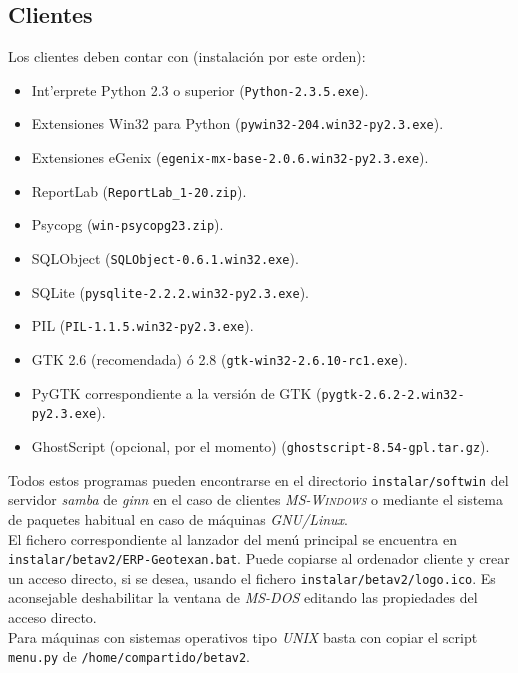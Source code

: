 \documentclass[a4paper]{article}
\newcommand{\marginalnote}[1]{\mbox{}\marginpar{\raggedright\hspace{0pt}#1}}
\newcommand{\iconomargen}[2]{%
  \marginalnote{%
    \parbox[t][\baselineskip * (#1-1)][b]{\marginparwidth}{%
      \texttt{[image: \#2]}%
    }
  }
}
\begin{document}
        \subsection{Clientes}
            Los clientes deben contar con (instalación por este orden):
            \begin{itemize}
            \item Int'erprete Python 2.3 o superior (\texttt{Python-2.3.5.exe}).
            \item Extensiones Win32 para Python (\texttt{pywin32-204.win32-py2.3.exe}).
            \item Extensiones eGenix (\texttt{egenix-mx-base-2.0.6.win32-py2.3.exe}).
            \item ReportLab (\texttt{ReportLab\_1-20.zip}).
            \item Psycopg (\texttt{win-psycopg23.zip}).
            \item SQLObject (\texttt{SQLObject-0.6.1.win32.exe}).
            \item SQLite (\texttt{pysqlite-2.2.2.win32-py2.3.exe}).
            \item PIL (\texttt{PIL-1.1.5.win32-py2.3.exe}).
            \item GTK 2.6 \small{(recomendada)} ó 2.8 (\texttt{gtk-win32-2.6.10-rc1.exe}).
            \item PyGTK correspondiente a la versión de GTK (\texttt{pygtk-2.6.2-2.win32-py2.3.exe}).
            \item GhostScript \small{(opcional, por el momento)} (\texttt{ghostscript-8.54-gpl.tar.gz}).
            \end{itemize}
\iconomargen{3}{link}
            Todos estos programas pueden encontrarse en el directorio \texttt{instalar/softwin} del servidor \emph{samba} de \emph{ginn} en el caso de clientes \emph{\textsc{MS-Windows}} o mediante el sistema de paquetes habitual en caso de máquinas \emph{GNU/Linux}.\\
            El fichero correspondiente al lanzador del menú principal se encuentra en \\ \texttt{instalar/betav2/ERP-Geotexan.bat}. Puede copiarse al ordenador cliente y crear un acceso directo, si se desea, usando el fichero \texttt{instalar/betav2/logo.ico}. Es aconsejable deshabilitar la ventana de \emph{MS-DOS} editando las propiedades del acceso directo.\\
            Para máquinas con sistemas operativos tipo \emph{UNIX} basta con copiar el script \texttt{menu.py} de \texttt{/home/compartido/betav2}.
\end{document}

